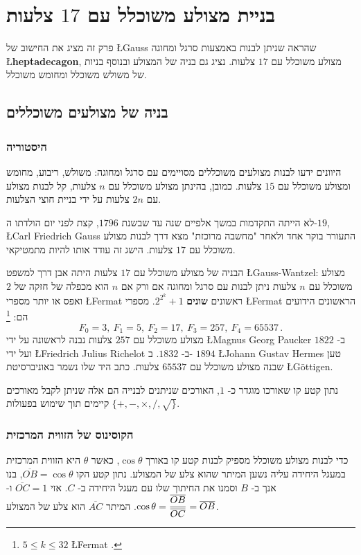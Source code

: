 

\chapter{בניית מצולע משוכלל עם 
$17$
צלעות}
\label{c.heptadecagon}


פרק זה מציג את החישוב של 
\L{Gauss}
שהראה שניתן לבנות  באמצעות סרגל ומחוגה
\L{\textbf{heptadecagon}},
מצולע משוכלל עם 
$17$
צלעות.
נציג גם בניה של המצולע ובנוסף בניות של משולש משוכלל ומחומש משוכלל.
\section{בניה של מצולעים משוכללים}

\subsection{היסטוריה}
היוונים ידעו לבנות מצולעים משוכללים מסויימים  עם סרגל ומחוגה: משולש, ריבוע, מחומש ומצולע משוכלל עם $15$ צלעות.
כמובן, בהינתן מצולע משוכלל עם
$n$
צלעות, קל לבנות מצולע עם 
$2n$
צלעות על ידי בניית חוצי הצלעות.

לא הייתה התקדמות במשך אלפיים שנה עד שבשנת
$1796$,
קצת לפני יום הולדתו ה-$19$,
\L{Carl Friedrich Gauss}
התעורר בוקר אחד ולאחר "מחשבה מרוכזת" מצא דרך לבנות מצולע משוכלל עם 
$17$
צלעות. הישג זה עודד אותו להיות מתמטיקאי.

הבניה של מצולע משוכלל עם 
$17$
צלעות היתה אבן דרך למשפט
\L{Gauss-Wantzel}:
מצולע משוכלל עם 
$n$
צלעות ניתן לבנות עם סרגל ומחוגה אם ורק אם 
$n$
הוא מכפלה של חזקה של
$2$
ואפס או יותר מספרי 
\L{Fermat}
ראשונים
\textbf{שונים}
$2^{2^k}+1$.
מספרי 
\L{Fermat}
הראשונים הידועים הם:%
\footnote{%
$5\leq k \leq 32$
\L{Fermat}
.}
\[
F_0=3,\: F_1=5,\: F_2=17,\: F_3=257,\: F_4=65537\,.
\]
מצולע משוכלל עם
$257$
צלעות נבנה לראשונה על ידי
\L{Magnus Georg Paucker}
ב-%
$1822$
ועל ידי
\L{Friedrich Julius Richelot}
ב-%
$1832$.
ב-%
$1894$
\L{Johann Gustav Hermes}
טען שבנה מצולע משוכלל עם
$65537$
צלעות.
כתב היד שלו נשמר באוניברסיטת 
\L{G\"{o}ttigen}.

נתון קטע קו שאורכו מוגדר כ-%
$1$,
האורכים שניתנים לבנייה הם אלה שניתן לקבל מאורכים קיימים תוך שימוש בפעולות 
$\{+,-,\times,/,\surd\}$.


\subsection{הקוסינוס של הזווית המרכזית}
כדי לבנות מצולע משוכלל מספיק לבנות קטע קו באורך 
$\cos \theta$,
כאשר
$\theta$ 
היא הזווית המרכזית במעגל היחידה עליה נשען המיתר שהוא צלע של המצולע. נתון קטע הקו
$\overline{OB}=\cos\theta$,
בנו אנך ב-%
$B$
וסמנו את החיתוך שלו עם מעגל היחידה ב-%
$C$.
אזי
$\overline{OC}=1$
ו-%
$\cos \theta=\displaystyle\frac{\overline{OB}}{\overline{OC}}=\overline{OB}$.
המיתר 
$\overline{AC}$
הוא צלע של המצולע.

